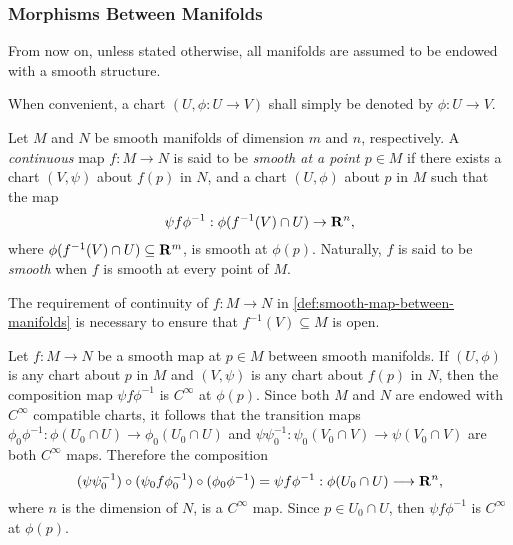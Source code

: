 \subsubsection{Morphisms Between Manifolds}

\begin{remark}
\label{rem:manifolds-convention-are-smooth}
From now on, unless stated otherwise, all manifolds are assumed to be endowed
with a smooth structure.
\end{remark}

\begin{remark}
\label{rem:chart-notation}
When convenient, a chart \((U, \phi: U \to V)\) shall simply be denoted by
\(\phi: U \to V\).
\end{remark}

\begin{definition}
\label{def:smooth-map-between-manifolds}
Let \(M\) and \(N\) be smooth manifolds of dimension \(m\) and \(n\),
respectively. A \emph{continuous} map \(f: M \to N\) is said to be \emph{smooth
  at a point \(p \in M\)} if there exists a chart \((V, \psi)\) about \(f(p)\)
in \(N\), and a chart \((U, \phi)\) about \(p\) in \(M\) such that the map
\[
\psi f \phi^{-1}: \phi(f^{-1}(V) \cap U) \to \mathbf{R}^n,
\]
where \(\phi(f^{-1}(V) \cap U) \subseteq \mathbf{R}^m\), is smooth at
\(\phi(p)\). Naturally, \(f\) is said to be \emph{smooth} when \(f\) is smooth
at every point of \(M\).
\end{definition}

\begin{remark}
\label{rem:continuous-requirement-in-smooth-map-definition}
The requirement of continuity of \(f: M \to N\) in
\cref{def:smooth-map-between-manifolds} is necessary to ensure that
\(f^{-1}(V) \subseteq M\) is open.
\end{remark}

\begin{lemma}
\label{lem:smooth-maps-choice-independent}
Let \(f: M \to N\) be a smooth map at \(p \in M\) between smooth manifolds. If
\((U, \phi)\) is any chart about \(p\) in \(M\) and \((V, \psi)\) is any chart
about \(f(p)\) in \(N\), then the composition map \(\psi f \phi^{-1}\) is
\(C^{\infty}\) at \(\phi(p)\). Since both \(M\) and \(N\) are endowed with
\(C^{\infty}\) compatible charts, it follows that the transition maps
\(\phi_0 \phi^{-1}: \phi(U_0 \cap U) \to \phi_0(U_{0} \cap U)\) and
\(\psi \psi_0^{-1}: \psi_0(V_0 \cap V) \to \psi(V_0 \cap V)\) are both
\(C^{\infty}\) maps. Therefore the composition
\[
(\psi \psi_0^{-1}) \circ (\psi_0 f \phi_0^{-1}) \circ (\phi_0 \phi^{-1})
= \psi f \phi^{-1}: \phi(U_0 \cap U) \longrightarrow \mathbf{R}^n,
\]
where \(n\) is the dimension of \(N\), is a \(C^{\infty}\) map. Since \(p \in
U_0 \cap U\), then \(\psi f \phi^{-1}\) is \(C^{\infty}\) at \(\phi(p)\).
\end{lemma}

